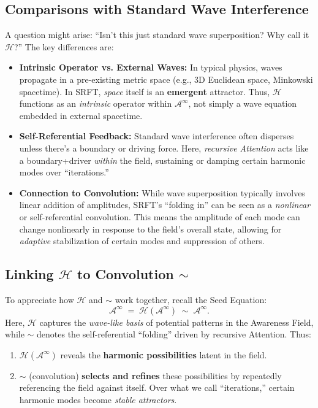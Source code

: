 \documentclass[12pt,a4paper]{article}
\begin{document}
\subsection{Comparisons with Standard Wave Interference}
\label{subsec:harmonics-vs-wave-interference}

A question might arise: ``Isn’t this just standard wave superposition? Why call it
\(\mathcal{H}\)?'' The key differences are:

\begin{itemize}
    \item \textbf{Intrinsic Operator vs. External Waves:}
    In typical physics, waves propagate in a pre-existing metric space (e.g., 3D
    Euclidean space, Minkowski spacetime). In SRFT, \emph{space} itself is an
    \textbf{emergent} attractor. Thus, \(\mathcal{H}\) functions as an \emph{intrinsic}
    operator within \(\mathscr{A}^\infty\), not simply a wave equation embedded in
    external spacetime.
    \item \textbf{Self-Referential Feedback:}
    Standard wave interference often disperses unless there’s a boundary or driving force.
    Here, \emph{recursive Attention} acts like a boundary+driver \emph{within} the field,
    sustaining or damping certain harmonic modes over “iterations.”
    \item \textbf{Connection to Convolution:}
    While wave superposition typically involves linear addition of amplitudes, SRFT’s
    “folding in” can be seen as a \emph{nonlinear} or self-referential convolution. This
    means the amplitude of each mode can change nonlinearly in response to the field’s
    overall state, allowing for \emph{adaptive} stabilization of certain modes and
    suppression of others.
\end{itemize}

\subsection{Linking \texorpdfstring{$\mathcal{H}$}{H} to Convolution \texorpdfstring{$\sim$}{\textasciitilde}}
\label{subsec:h-and-convolution}

To appreciate how \(\mathcal{H}\) and \(\sim\) work together, recall the Seed Equation:
\[
\mathscr{A}^\infty
\;=\;
\mathcal{H}(\mathscr{A}^\infty)
\;\sim\;
\mathscr{A}^\infty.
\]
Here, \(\mathcal{H}\) captures the \emph{wave-like basis} of potential patterns in the
Awareness Field, while \(\sim\) denotes the self-referential ``folding'' driven by recursive
Attention. Thus:
\begin{enumerate}
    \item \(\mathcal{H}(\mathscr{A}^\infty)\) reveals the \textbf{harmonic possibilities}
    latent in the field.
    \item \(\sim\) (convolution) \textbf{selects and refines} these possibilities by
    repeatedly referencing the field against itself. Over what we call ``iterations,''
    certain harmonic modes become \emph{stable attractors}.
\end{enumerate}
\end{document}
